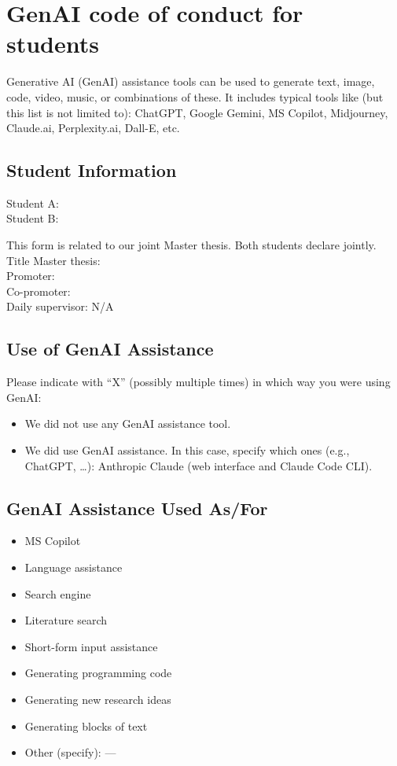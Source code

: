 \chapter{GenAI code of conduct for students}

Generative AI (GenAI) assistance tools can be used to generate text, image, code, video, music, or combinations of these. It includes typical tools like (but this list is not limited to): ChatGPT, Google Gemini, MS Copilot, Midjourney, Claude.ai, Perplexity.ai, Dall-E, etc.

\section*{Student Information}
\makeatletter%
\begin{tabbing}
Student A: \@forenameA \ \@surnameA \\
Student B: \@forenameB \ \@surnameB
\end{tabbing}
\makeatother

This form is related to our joint Master thesis. Both students declare jointly. \\
\makeatletter%
Title Master thesis: \@title \\
Promoter: \@promotorAname \\
Co-promoter: \@promotorBname \\
Daily supervisor: N/A
\makeatother


\section*{Use of GenAI Assistance}
Please indicate with ``X'' (possibly multiple times) in which way you were using GenAI:

\begin{itemize}
    \item[$\Box$] We did not use any GenAI assistance tool.
    \item[$\boxtimes$] We did use GenAI assistance. In this case, specify which ones (e.g., ChatGPT, \ldots): Anthropic Claude (web interface and Claude Code CLI).
\end{itemize}

\section*{GenAI Assistance Used As/For}
\begin{itemize}
    \item[$\Box$] MS Copilot
    \item[$\boxtimes$] Language assistance
    \item[$\boxtimes$] Search engine
    \item[$\boxtimes$] Literature search
    \item[$\Box$] Short-form input assistance
    \item[$\boxtimes$] Generating programming code
    \item[$\Box$] Generating new research ideas
    \item[$\Box$] Generating blocks of text
    \item[$\Box$] Other (specify): ---
\end{itemize}

